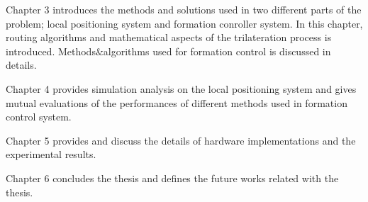 Chapter 3 introduces the methods and solutions used in two different parts of the problem; local positioning system and formation conroller system. In this chapter, routing algorithms and mathematical aspects of the trilateration process is introduced. Methods$\&$algorithms used for formation control is discussed in details.

Chapter 4 provides simulation analysis on the local positioning system and gives mutual evaluations of the performances of different methods used in formation control system.

Chapter 5 provides and discuss the details of hardware implementations and the experimental results.

Chapter 6 concludes the thesis and defines the future works related with the thesis.